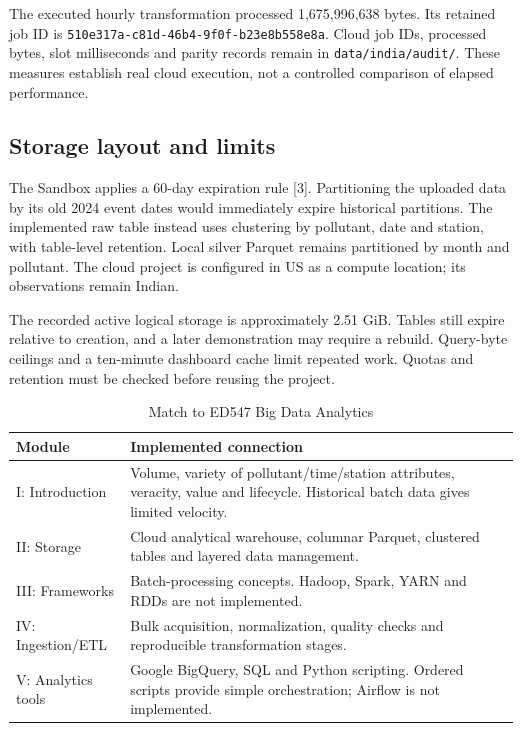 \documentclass[11pt,a4paper]{article}
\begin{document}
The executed hourly transformation processed 1,675,996,638 bytes. Its retained job ID is \texttt{510e317a-c81d-46b4-9f0f-b23e8b558e8a}. Cloud job IDs, processed bytes, slot milliseconds and parity records remain in \texttt{data/india/audit/}. These measures establish real cloud execution, not a controlled comparison of elapsed performance.

\subsection{Storage layout and limits}
The Sandbox applies a 60-day expiration rule [3]. Partitioning the uploaded data by its old 2024 event dates would immediately expire historical partitions. The implemented raw table instead uses clustering by pollutant, date and station, with table-level retention. Local silver Parquet remains partitioned by month and pollutant. The cloud project is configured in US as a compute location; its observations remain Indian.

The recorded active logical storage is approximately 2.51 GiB. Tables still expire relative to creation, and a later demonstration may require a rebuild. Query-byte ceilings and a ten-minute dashboard cache limit repeated work. Quotas and retention must be checked before reusing the project.

\begin{table}[H]\centering\caption{Match to ED547 Big Data Analytics}
\begin{tabularx}{\linewidth}{lY}\toprule
Module & Implemented connection\\\midrule
I: Introduction & Volume, variety of pollutant/time/station attributes, veracity, value and lifecycle. Historical batch data gives limited velocity.\\
II: Storage & Cloud analytical warehouse, columnar Parquet, clustered tables and layered data management.\\
III: Frameworks & Batch-processing concepts. Hadoop, Spark, YARN and RDDs are not implemented.\\
IV: Ingestion/ETL & Bulk acquisition, normalization, quality checks and reproducible transformation stages.\\
V: Analytics tools & Google BigQuery, SQL and Python scripting. Ordered scripts provide simple orchestration; Airflow is not implemented.\\\bottomrule
\end{tabularx}\end{table}
\end{document}
